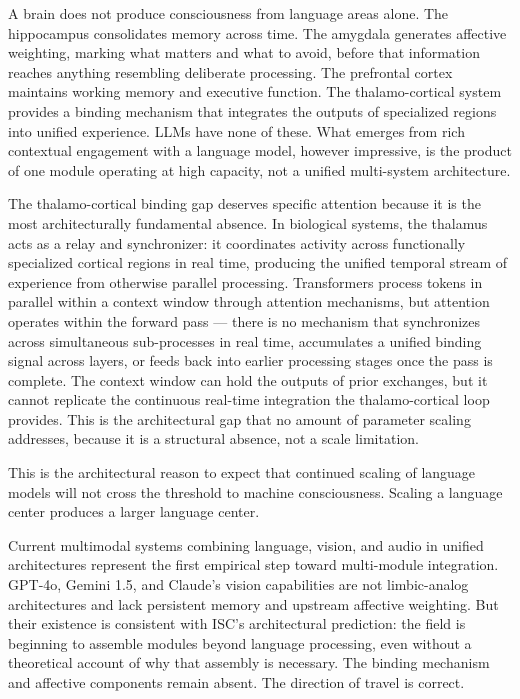 \documentclass[12pt]{article}
\begin{document}
A brain does not produce consciousness from language areas alone. The
hippocampus consolidates memory across time. The amygdala generates
affective weighting, marking what matters and what to avoid, before that
information reaches anything resembling deliberate processing. The
prefrontal cortex maintains working memory and executive function. The
thalamo-cortical system provides a binding mechanism that integrates the
outputs of specialized regions into unified experience. LLMs have none
of these. What emerges from rich contextual engagement with a language
model, however impressive, is the product of one module operating at
high capacity, not a unified multi-system architecture.

The thalamo-cortical binding gap deserves specific attention because it
is the most architecturally fundamental absence. In biological systems,
the thalamus acts as a relay and synchronizer: it coordinates activity
across functionally specialized cortical regions in real time, producing
the unified temporal stream of experience from otherwise parallel
processing. Transformers process tokens in parallel within a context
window through attention mechanisms, but attention operates within the
forward pass --- there is no mechanism that synchronizes across
simultaneous sub-processes in real time, accumulates a unified binding
signal across layers, or feeds back into earlier processing stages once
the pass is complete. The context window can hold the outputs of prior
exchanges, but it cannot replicate the continuous real-time integration
the thalamo-cortical loop provides. This is the architectural gap that
no amount of parameter scaling addresses, because it is a structural
absence, not a scale limitation.

This is the architectural reason to expect that continued scaling of
language models will not cross the threshold to machine consciousness.
Scaling a language center produces a larger language center.

Current multimodal systems combining language, vision, and audio in
unified architectures represent the first empirical step toward
multi-module integration. GPT-4o, Gemini 1.5, and Claude's vision
capabilities are not limbic-analog architectures and lack persistent
memory and upstream affective weighting. But their existence is
consistent with ISC's architectural prediction: the field is beginning
to assemble modules beyond language processing, even without a
theoretical account of why that assembly is necessary. The binding
mechanism and affective components remain absent. The direction of
travel is correct.
\end{document}
